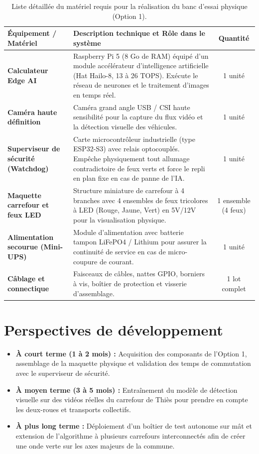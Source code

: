 \documentclass[11pt,a4paper]{article}
\begin{document}
\begin{table}[ht]
\centering
\small
\renewcommand{\arraystretch}{1.25}
\begin{tabular}{>{\bfseries}p{4.2cm} p{7.5cm} c}
\toprule
Équipement / Matériel & Description technique et Rôle dans le système & Quantité \\
\midrule
Calculateur Edge AI & 
Raspberry Pi 5 (8 Go de RAM) équipé d'un module accélérateur d'intelligence artificielle (Hat Hailo-8, 13 à 26 TOPS). Exécute le réseau de neurones et le traitement d'images en temps réel. & 1 unité \\
\midrule
Caméra haute définition & 
Caméra grand angle USB / CSI haute sensibilité pour la capture du flux vidéo et la détection visuelle des véhicules. & 1 unité \\
\midrule
Superviseur de sécurité (Watchdog) & 
Carte microcontrôleur industrielle (type ESP32-S3) avec relais optocouplés. Empêche physiquement tout allumage contradictoire de feux verts et force le repli en plan fixe en cas de panne de l'IA. & 1 unité \\
\midrule
Maquette carrefour et feux LED & 
Structure miniature de carrefour à 4 branches avec 4 ensembles de feux tricolores à LED (Rouge, Jaune, Vert) en 5V/12V pour la visualisation physique. & 1 ensemble (4 feux) \\
\midrule
Alimentation secourue (Mini-UPS) & 
Module d'alimentation avec batterie tampon LiFePO4 / Lithium pour assurer la continuité de service en cas de micro-coupure de courant. & 1 unité \\
\midrule
Câblage et connectique & 
Faisceaux de câbles, nattes GPIO, borniers à vis, boîtier de protection et visserie d'assemblage. & 1 lot complet \\
\bottomrule
\end{tabular}
\caption{Liste détaillée du matériel requis pour la réalisation du banc d'essai physique (Option 1).}
\label{tab:devis_option1}
\end{table}

\section{Perspectives de développement}

\begin{itemize}
    \item \textbf{À court terme (1 à 2 mois) :} Acquisition des composants de l'Option 1, assemblage de la maquette physique et validation des temps de commutation avec le superviseur de sécurité.
    \item \textbf{À moyen terme (3 à 5 mois) :} Entraînement du modèle de détection visuelle sur des vidéos réelles du carrefour de Thiès pour prendre en compte les deux-roues et transports collectifs.
    \item \textbf{À plus long terme :} Déploiement d'un boîtier de test autonome sur mât et extension de l'algorithme à plusieurs carrefours interconnectés afin de créer une onde verte sur les axes majeurs de la commune.
\end{itemize}
\end{document}
